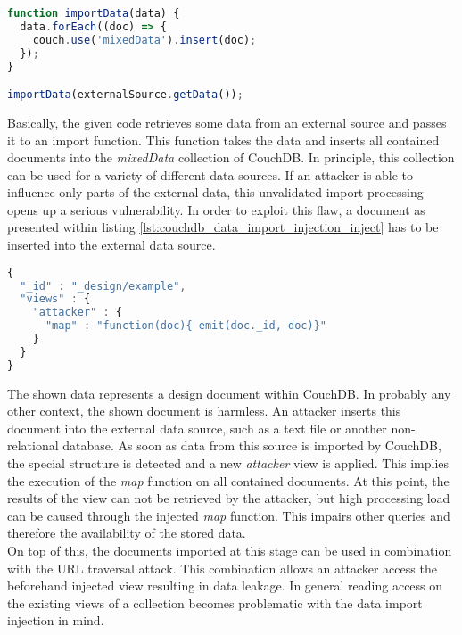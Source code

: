 \begin{lstlisting}[caption={Vulnerable NodeJS example for data import injection on CouchDB}, label={lst:couchdb_data_import_injection_app}, language=JavaScript]
function importData(data) {
  data.forEach((doc) => {
    couch.use('mixedData').insert(doc);
  });
}

importData(externalSource.getData());
\end{lstlisting}

Basically, the given code retrieves some data from an external source and passes it to an import function. This function takes the data and inserts all contained documents into the \emph{mixedData} collection of CouchDB. In principle, this collection can be used for a variety of different data sources. If an attacker is able to influence only parts of the external data, this unvalidated import processing opens up a serious vulnerability. In order to exploit this flaw, a document as presented within listing \ref{lst:couchdb_data_import_injection_inject} has to be inserted into the external data source.

\begin{lstlisting}[caption={Attack vectors on CouchDB for data import injection}, label={lst:couchdb_data_import_injection_inject}, language=JavaScript]
{
  "_id" : "_design/example",
  "views" : {
    "attacker" : {
      "map" : "function(doc){ emit(doc._id, doc)}"
    }
  }
}
\end{lstlisting}

The shown data represents a design document within CouchDB. In probably any other context, the shown document is harmless. An attacker inserts this document into the external data source, such as a text file or another non-relational database. As soon as data from this source is imported by CouchDB, the special structure is detected and a new \emph{attacker} view is applied. This implies the execution of the \emph{map} function on all contained documents. At this point, the results of the view can not be retrieved by the attacker, but high processing load can be caused through the injected \emph{map} function. This impairs other queries and therefore the availability of the stored data. \\

On top of this, the documents imported at this stage can be used in combination with the URL traversal attack. This combination allows an attacker access the beforehand injected view resulting in data leakage. In general reading access on the existing views of a collection becomes problematic with the data import injection in mind. \\

